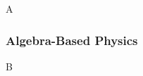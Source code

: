 \documentclass[../../../main.tex]{subfiles}
\begin{document}
A

\subsubsection{Algebra-Based Physics}

B
\end{document}
